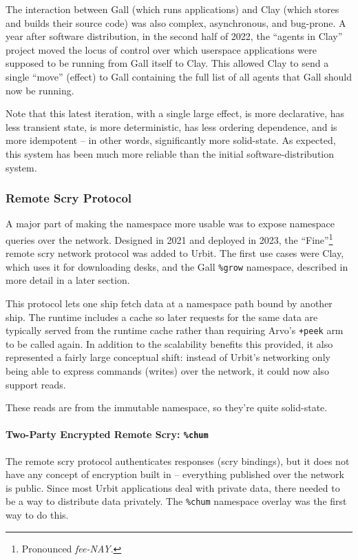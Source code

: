 \documentclass[twoside]{article}
\begin{document}
The interaction between Gall (which runs applications) and Clay (which stores and builds their source code) was also complex, asynchronous, and bug-prone.  A year after software distribution, in the second half of 2022, the ``agents in Clay'' project moved the locus of control over which userspace applications were supposed to be running from Gall itself to Clay.  This allowed Clay to send a single ``move'' (effect) to Gall containing the full list of all agents that Gall should now be running.

Note that this latest iteration, with a single large effect, is more declarative, has less transient state, is more deterministic, has less ordering dependence, and is more idempotent – in other words, significantly more solid-state.  As expected, this system has been much more reliable than the initial software-distribution system.

\subsubsection{Remote Scry Protocol}

A major part of making the namespace more usable was to expose namespace queries over the network.  Designed in 2021 and deployed in 2023, the ``Fine''\footnote{Pronounced \emph{fee-NAY}.} remote scry network protocol was added to Urbit.  The first use cases were Clay, which uses it for downloading desks, and the Gall \lstinline[style=inlinecode]{%grow} namespace, described in more detail in a later section.

This protocol lets one ship fetch data at a namespace path bound by another ship.  The runtime includes a cache so later requests for the same data are typically served from the runtime cache rather than requiring Arvo's \lstinline[style=inlinecode]{+peek} arm to be called again.  In addition to the scalability benefits this provided, it also represented a fairly large conceptual shift: instead of Urbit's networking only being able to express commands (writes) over the network, it could now also support reads.

These reads are from the immutable namespace, so they're quite solid-state.

\paragraph{Two-Party Encrypted Remote Scry: \texttt{\%chum}}  The remote scry protocol authenticates responses (scry bindings), but it does not have any concept of encryption built in – everything published over the network is public.  Since most Urbit applications deal with private data, there needed to be a way to distribute data privately.  The \lstinline[style=inlinecode]{%chum} namespace overlay was the first way to do this.
\end{document}
